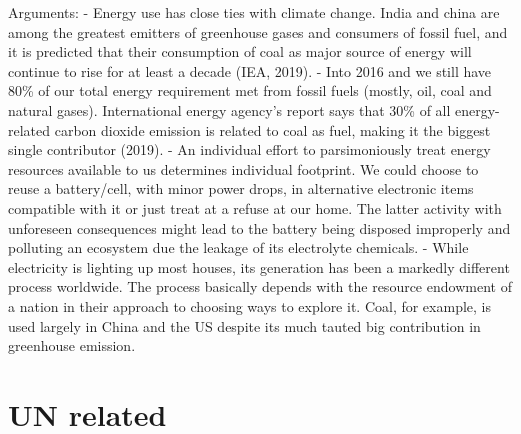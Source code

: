 \documentclass[
]{book}
\begin{document}
Arguments:
- Energy use has close ties with climate change. India and china are among the greatest emitters of greenhouse gases and consumers of fossil fuel, and it is predicted that their consumption of coal as major source of energy will continue to rise for at least a decade (IEA, 2019).
- Into 2016 and we still have 80\% of our total energy requirement met from fossil fuels (mostly, oil, coal and natural gases). International energy agency's report says that 30\% of all energy-related carbon dioxide emission is related to coal as fuel, making it the biggest single contributor (2019).
- An individual effort to parsimoniously treat energy resources available to us determines individual footprint. We could choose to reuse a battery/cell, with minor power drops, in alternative electronic items compatible with it or just treat at a refuse at our home. The latter activity with unforeseen consequences might lead to the battery being disposed improperly and polluting an ecosystem due the leakage of its electrolyte chemicals.
- While electricity is lighting up most houses, its generation has been a markedly different process worldwide. The process basically depends with the resource endowment of a nation in their approach to choosing ways to explore it. Coal, for example, is used largely in China and the US despite its much tauted big contribution in greenhouse emission.

\hypertarget{un-related}{%
\section{UN related}\label{un-related}}
\end{document}
